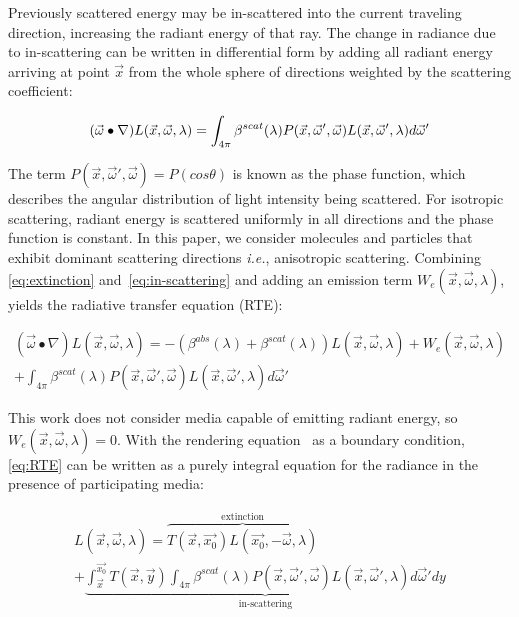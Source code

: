 \documentclass[journal]{vgtc}                %
\begin{document}
Previously scattered energy may be in-scattered into the current traveling direction, increasing the radiant energy of that ray.  The change in radiance due to in-scattering can be written in differential form by adding all radiant energy arriving at point $\vec{x}$ from the whole sphere of directions weighted by the scattering coefficient:

\begin{equation}\label{eq:in-scattering}
\small
(\vec{\omega}\bullet \nabla)L(\vec{x},\vec{\omega}, \lambda) = \int_{4\pi}{ \beta^{scat}(\lambda)P(\vec{x}, \vec{\omega}', \vec{\omega})L(\vec{x},\vec{\omega}', \lambda)d\vec{\omega}'}
\end{equation}

The term $P(\vec{x}, \vec{\omega}', \vec{\omega}) = P(cos\theta)$ is known as the phase function, which describes the angular distribution of light intensity being scattered. For isotropic scattering, radiant energy is scattered uniformly in all directions and the phase function is constant. In this paper, we consider molecules and particles that exhibit dominant scattering directions \textit{i.e.}, anisotropic scattering. Combining \autoref{eq:extinction} and~\autoref{eq:in-scattering} and adding an emission term $W_{e}(\vec{x},\vec{\omega}, \lambda)$, yields the radiative transfer equation (RTE):

\vspace*{-4.5mm}
{
  \small
\begin{multline}\label{eq:RTE}
(\vec{\omega}\bullet \nabla)L(\vec{x},\vec{\omega}, \lambda) = - (\beta^{abs}(\lambda) + \beta^{scat}(\lambda))L(\vec{x},\vec{\omega}, \lambda) + W_{e}(\vec{x},\vec{\omega}, \lambda)\\
 + \int_{4\pi}{ \beta^{scat}(\lambda)P(\vec{x}, \vec{\omega}', \vec{\omega})L(\vec{x},\vec{\omega}', \lambda)d\vec{\omega}'}
\end{multline}
}
\vspace*{-4mm}

This work does not consider media capable of emitting radiant energy, so $W_{e}(\vec{x},\vec{\omega}, \lambda) = 0$. With the rendering equation~\cite{Kajiya:1986} as a boundary condition, \autoref{eq:RTE} can be written as a purely integral equation for the radiance in the presence of participating media:

\vspace*{-6mm}
{
  \small
  \begin{multline}\label{eq:VRE}
    L(\vec{x},\vec{\omega}, \lambda) = \overbrace{T(\vec{x}, \vec{x_0})L(\vec{x_0},-\vec{\omega}, \lambda)}^{\text{extinction}}\\
    + \underbrace{\int_{\vec{x}}^{\vec{x_0}}{T(\vec{x}, \vec{y})\int_{4\pi}{ \beta^{scat}(\lambda)P(\vec{x}, \vec{\omega}', \vec{\omega})L(\vec{x},\vec{\omega}', \lambda)d\vec{\omega}'}dy}}_{\text{in-scattering}}
  \end{multline}
}
\vspace*{-2.5mm}
\end{document}

